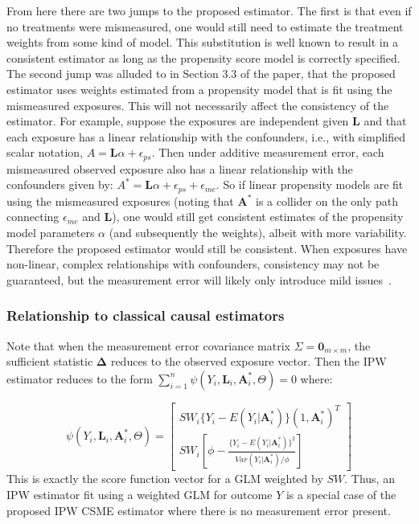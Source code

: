 \documentclass[12pt]{article}
\begin{document}
From here there are two jumps to the proposed estimator. The first is that even if no treatments were mismeasured, one would still need to estimate the treatment weights from some kind of model. This substitution is well known to result in a consistent estimator as long as the propensity score model is correctly specified. The second jump was alluded to in Section 3.3 of the paper, that the proposed estimator uses weights estimated from a propensity model that is fit using the mismeasured exposures. This will not necessarily affect the consistency of the estimator. For example, suppose the exposures are independent given $\bm{L}$ and that each exposure has a linear relationship with the confounders, i.e., with simplified scalar notation, $A = \bm{L} \alpha + \epsilon_{ps}$. Then under additive measurement error, each mismeasured observed exposure also has a linear relationship with the confounders given by: $A^{*} = \bm{L} \alpha + \epsilon_{ps} + \epsilon_{me}$. So if linear propensity models are fit using the mismeasured exposures (noting that $\bm{A}^{*}$ is a collider on the only path connecting $\epsilon_{me}$ and $\bm{L}$), one would still get consistent estimates of the propensity model parameters $\alpha$ (and subsequently the weights), albeit with more variability. Therefore the proposed estimator would still be consistent. When exposures have non-linear, complex relationships with confounders, consistency may not be guaranteed, but the measurement error will likely only introduce mild issues~\citep{carroll2006}.

\subsubsection{Relationship to classical causal estimators}

Note that when the measurement error covariance matrix $\Sigma = \textbf{0}_{m \times m}$, the sufficient statistic $\bm{\Delta}$ reduces to the observed exposure vector. Then the IPW estimator reduces to the form $\sum_{i=1}^{n} \psi(Y_{i}, \bm{L}_{i}, \bm{A}^{*}_{i}, \Theta) = 0$ where:

\begin{equation}
    \psi(Y_{i}, \bm{L}_{i}, \bm{A}^{*}_{i}, \Theta) =
    \begin{bmatrix}
       SW_{i}\{ Y_{i} - E(Y_{i} | \bm{A}^{*}_{i}) \} (1, \bm{A}^{*}_{i})^{T} \\
       SW_{i} \left [ \phi - \frac{ \{Y_{i} - E(Y_{i} | \bm{A}^{*}_{i}) \}^{2}}{Var(Y_{i} | \bm{A}^{*}_{i}) / \phi} \right ]
    \end{bmatrix}
\end{equation}
This is exactly the score function vector for a GLM weighted by $SW$. Thus, an IPW estimator fit using a weighted GLM for outcome $Y$ is a special case of the proposed IPW CSME estimator where there is no measurement error present.
\end{document}
